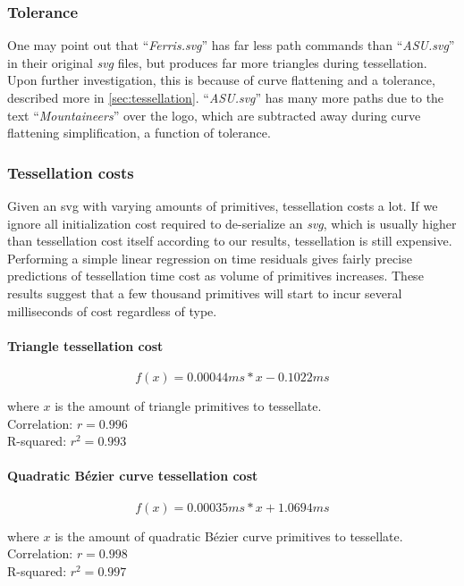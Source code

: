 \subsubsection{Tolerance} One may point out that ``\textit{Ferris.svg}'' has far less path commands than ``\textit{ASU.svg}'' in their original \textit{svg} files, but produces far more triangles during tessellation. Upon further investigation, this is because of curve flattening and a tolerance, described more in \cref{sec:tessellation}. ``\textit{ASU.svg}'' has many more paths due to the text ``\textit{Mountaineers}'' over the logo, which are subtracted away during curve flattening simplification, a function of tolerance.

\subsubsection{Tessellation costs} Given an svg with varying amounts of primitives, tessellation costs a lot. If we ignore all initialization cost required to de-serialize an \textit{svg}, which is usually higher than tessellation cost itself according to our results, tessellation is still expensive. Performing a simple linear regression on time residuals gives fairly precise predictions of tessellation time cost as volume of primitives increases. These results suggest that a few thousand primitives will start to incur several milliseconds of cost regardless of type.

\paragraph{Triangle tessellation cost}
\begin{equation}\label{eq:tesscost_triangle}
f(x)=0.00044ms*x-0.1022ms
\end{equation}
\begin{center}
where \(x\) is the amount of triangle primitives to tessellate.\\
Correlation: \(r=0.996\)\\
R-squared:	\(r^2=0.993\)
\end{center}

\paragraph{Quadratic Bézier curve tessellation cost}
\begin{equation}\label{eq:tesscost_quadratic_bezier}
f(x)=0.00035ms*x+1.0694ms
\end{equation}
\begin{center}
where \(x\) is the amount of quadratic Bézier curve primitives to tessellate.\\
Correlation: \(r=0.998\)\\
R-squared:	\(r^2=0.997\)
\end{center}

